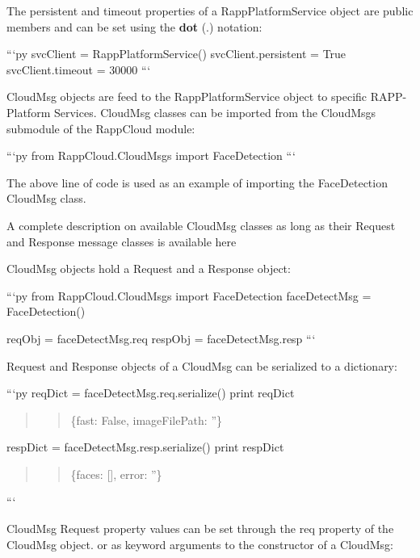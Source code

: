 The {\ttfamily persistent} and {\ttfamily timeout} properties of a {\ttfamily Rapp\-Platform\-Service} object are public members and can be set using the {\bfseries dot} (.) notation\-:

```py svc\-Client = Rapp\-Platform\-Service() svc\-Client.\-persistent = True svc\-Client.\-timeout = 30000 ```

{\ttfamily Cloud\-Msg} objects are feed to the {\ttfamily Rapp\-Platform\-Service} object to specific R\-A\-P\-P-\/\-Platform Services. {\ttfamily Cloud\-Msg} classes can be imported from the Cloud\-Msgs submodule of the Rapp\-Cloud module\-:

```py from Rapp\-Cloud.\-Cloud\-Msgs import Face\-Detection ```

The above line of code is used as an example of importing the {\ttfamily Face\-Detection} Cloud\-Msg class.

A complete description on available Cloud\-Msg classes as long as their Request and Response message classes is available here

Cloud\-Msg objects hold a Request and a Response object\-:

```py from Rapp\-Cloud.\-Cloud\-Msgs import Face\-Detection face\-Detect\-Msg = Face\-Detection()

req\-Obj = face\-Detect\-Msg.\-req resp\-Obj = face\-Detect\-Msg.\-resp ```

Request and Response objects of a Cloud\-Msg can be serialized to a dictionary\-:

```py req\-Dict = face\-Detect\-Msg.\-req.\-serialize() print req\-Dict \begin{quotation}
\begin{quotation}
\{fast\-: False, image\-File\-Path\-: ''\}

\end{quotation}


\end{quotation}


resp\-Dict = face\-Detect\-Msg.\-resp.\-serialize() print resp\-Dict \begin{quotation}
\begin{quotation}
\{faces\-: \mbox{[}\mbox{]}, error\-: ''\}

\end{quotation}


\end{quotation}
```

Cloud\-Msg Request property values can be set through the {\ttfamily req} property of the Cloud\-Msg object. or as keyword arguments to the constructor of a Cloud\-Msg\-:

